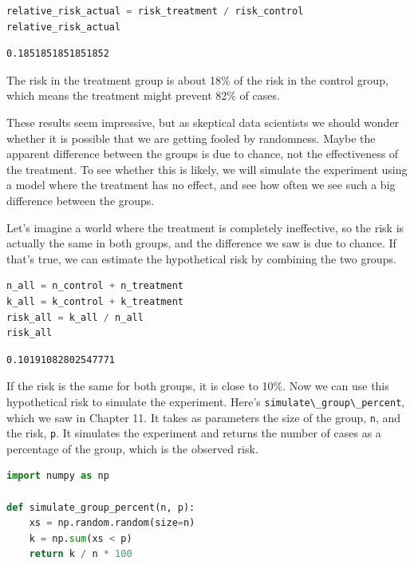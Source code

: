 \begin{lstlisting}[language=Python,style=source]
relative_risk_actual = risk_treatment / risk_control
relative_risk_actual
\end{lstlisting}

\begin{lstlisting}[style=output]
0.1851851851851852
\end{lstlisting}

The risk in the treatment group is about 18\% of the risk in the control
group, which means the treatment might prevent 82\% of cases.

These results seem impressive, but as skeptical data scientists we
should wonder whether it is possible that we are getting fooled by
randomness. Maybe the apparent difference between the groups is due to
chance, not the effectiveness of the treatment. To see whether this is
likely, we will simulate the experiment using a model where the
treatment has no effect, and see how often we see such a big difference
between the groups.

Let's imagine a world where the treatment is completely ineffective, so
the risk is actually the same in both groups, and the difference we saw
is due to chance. If that's true, we can estimate the hypothetical risk
by combining the two groups.

\begin{lstlisting}[language=Python,style=source]
n_all = n_control + n_treatment
k_all = k_control + k_treatment
risk_all = k_all / n_all
risk_all
\end{lstlisting}

\begin{lstlisting}[style=output]
0.10191082802547771
\end{lstlisting}

If the risk is the same for both groups, it is close to 10\%. Now we can
use this hypothetical risk to simulate the experiment. Here's
\passthrough{\lstinline!simulate\_group\_percent!}, which we saw in
Chapter 11. It takes as parameters the size of the group,
\passthrough{\lstinline!n!}, and the risk, \passthrough{\lstinline!p!}.
It simulates the experiment and returns the number of cases as a
percentage of the group, which is the observed risk.

\begin{lstlisting}[language=Python,style=source]
import numpy as np

def simulate_group_percent(n, p):
    xs = np.random.random(size=n)
    k = np.sum(xs < p)
    return k / n * 100
\end{lstlisting}


